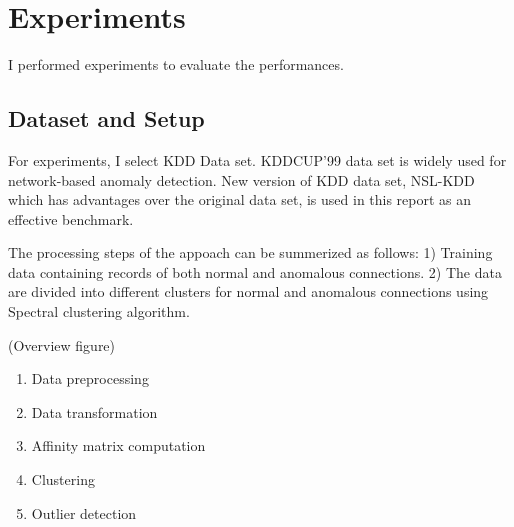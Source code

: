 \section{Experiments}
I performed experiments to evaluate the performances.

\subsection{Dataset and Setup}
For experiments, I select KDD Data set. 
KDDCUP'99 data set is widely used for network-based anomaly detection. New version of KDD data set, NSL-KDD which has advantages over the original data set, is used in this report as an effective benchmark.


The processing steps of the appoach can be summerized as follows:
1) Training data containing records of both normal and anomalous connections.
2) The data are divided into different clusters for normal and anomalous connections using Spectral clustering algorithm.

(Overview figure)
\begin{enumerate}
\item Data preprocessing
\item Data transformation
\item Affinity matrix computation
\item Clustering
\item Outlier detection
\end{enumerate}


